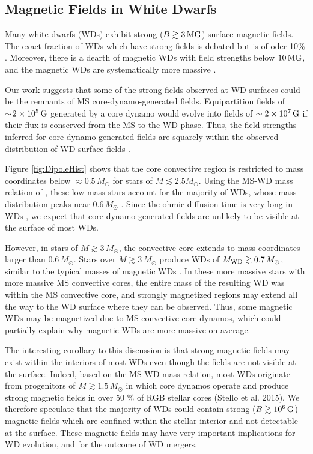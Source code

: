 \subsection{Magnetic Fields in White Dwarfs}

Many white dwarfs (WDs) exhibit strong ($B \gtrsim 3 \, {\rm MG}$) surface magnetic fields. The exact fraction of WDs which have strong fields is debated but is of oder 10\% \citep{Hollands_2015}. Moreover, there is a dearth of magnetic WDs with field strengths below $10 \, {\rm MG}$, and the magnetic WDs are systematically more massive \citep{Ferrario_2015B}.

Our work suggests that some of the strong fields observed at WD surfaces could be the remnants of MS core-dynamo-generated fields. Equipartition fields of $\sim \! 2 \times 10^5 \, {\rm G}$ generated by a core dynamo would evolve into fields of $\sim 2 \times 10^7 \, {\rm G}$ if their flux is conserved from the MS to the WD phase. Thus, the field strengths inferred for core-dynamo-generated fields are squarely within the observed distribution of WD surface fields \citep{Ferrario_2015A,Ferrario_2015B}.

Figure \ref{fig:DipoleHist} shows that the core convective region is restricted to mass coordinates below $\approx 0.5 \, M_\odot$ for stars of $M \lesssim 2.5 M_\odot$. Using the MS-WD mass relation of \cite{Renedo_2010}, these low-mass stars account for the majority of WDs, whose mass distribution peaks near $0.6 \, M_\odot$ \citep{Rebassa-Mansergas_2015}. Since the ohmic diffusion time is very long in WDs \citep{Ferrario_2015B}, we expect that core-dynamo-generated fields are unlikely to be visible at the surface of most WDs. 

However, in stars of $M \gtrsim 3 \, M_\odot$, the convective core extends to mass coordinates larger than $0.6 \, M_\odot$. Stars over $M \gtrsim 3 \, M_\odot$ produce WDs of $M_{\rm WD} \gtrsim 0.7 \, M_\odot$, similar to the typical masses of magnetic WDs \citep{Ferrario_2015B}. In these more massive stars with more massive MS convective cores, the entire mass of the resulting WD was within the MS convective core, and strongly magnetized regions may extend all the way to the WD surface where they can be observed. Thus, some magnetic WDs may be magnetized due to MS convective core dynamos, which could partially explain why magnetic WDs are more massive on average.

The interesting corollary to this discussion is that strong magnetic fields may exist within the interiors of most WDs even though the fields are not visible at the surface. Indeed, based on the MS-WD mass relation, most WDs originate from progenitors of $M \gtrsim 1.5 \, M_\odot$ in which core dynamos operate and produce strong magnetic fields in over 50 \% of RGB stellar cores (Stello et al. 2015). We therefore speculate that the majority of WDs could contain strong ($B \gtrsim 10^6 \, {\rm G}$) magnetic fields which are confined within the stellar interior and not detectable at the surface. These magnetic fields may have very important implications for WD evolution, and for the outcome of WD mergers. 



